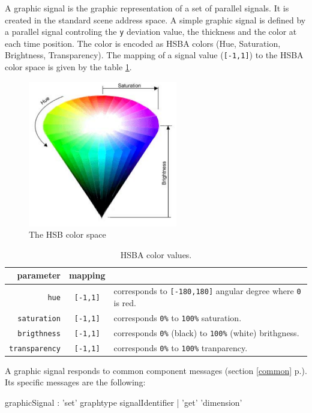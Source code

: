\documentclass[a4paper,twoside]{report}
\newcommand{\fullref}[1]	{\ref{#1} p.\pageref{#1}}
\newcommand{\OSC}[1]		{\texttt{#1}}
\newcommand{\values}[1]		{\texttt{#1}}
\begin{document}
A graphic signal is the graphic representation of a set of parallel signals. It is created in the standard scene address space. A simple graphic signal is defined by a parallel signal controling the \values{y} deviation value, the thickness and the color at each time position. The color is encoded as HSBA colors (Hue, Saturation, Brightness, Transparency). The mapping of a signal value  (\values{[-1,1]}) to the HSBA color space is given by the table \ref{hsbamap}. 

\begin{figure}[h]
	\centering \includegraphics[width=65mm]{imgs/hsb}
 \caption{The HSB color space}
 \label{hsbfiug}
\end{figure}


\begin{table}[htbp]
\caption{HSBA color values.}
\begin{center}
\begin{tabular}{|r|cl|}
\hline
parameter & mapping & \\
\hline
\OSC{hue}				& \OSC{[-1,1]} & corresponds to \OSC{[-180,180]} angular degree where \OSC{0} is red. \\
\OSC{saturation}		& \OSC{[-1,1]} & corresponds \OSC{0\%} to \OSC{100\%} saturation. \\
\OSC{brigthness}		& \OSC{[-1,1]} & corresponds \OSC{0\%} (black) to \OSC{100\%} (white) brithgness. \\
\OSC{transparency}		& \OSC{[-1,1]} & corresponds \OSC{0\%} to \OSC{100\%} tranparency. \\
\hline
\end{tabular}
\end{center}
\label{hsbamap}
\end{table}



A graphic signal responds to common component messages (section \fullref{common}). Its specific messages are the following:
\begin{rail}
graphicSignal : 'set' graphtype signalIdentifier 
			| 'get' 'dimension'
\end{rail}
\end{document}
